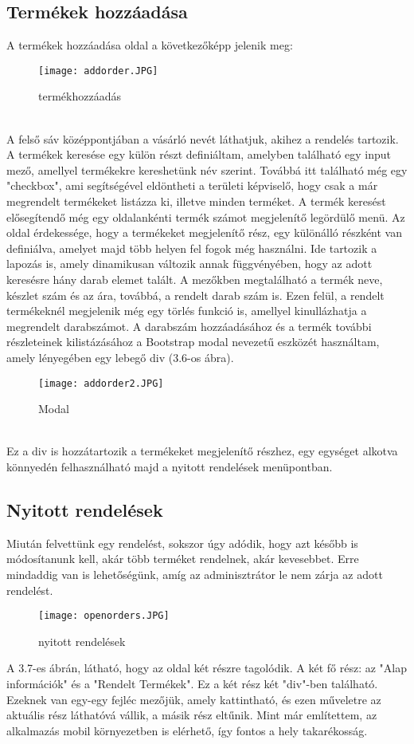 \subsection{Termékek hozzáadása}
A termékek hozzáadása oldal a következőképp jelenik meg:
\begin{figure}[h]
    \centering
    \texttt{[image: addorder.JPG]}
    \caption{termékhozzáadás}
\end{figure}
\\
A felső sáv középpontjában a vásárló nevét láthatjuk, akihez a rendelés tartozik. A termékek keresése egy külön részt definiáltam, amelyben található egy input mező, amellyel termékekre kereshetünk név szerint. Továbbá itt található még egy "checkbox", ami segítségével eldöntheti a területi képviselő, hogy csak a már megrendelt termékeket listázza ki, illetve minden terméket. A termék keresést elősegítendő még egy oldalankénti termék számot megjelenítő legördülő menü. 
Az oldal érdekessége, hogy a termékeket megjelenítő rész, egy különálló részként van definiálva, amelyet majd több helyen fel fogok még használni. Ide tartozik a lapozás is, amely dinamikusan változik annak függvényében, hogy az adott keresésre hány darab elemet talált. A mezőkben megtalálható a termék neve, készlet szám és az ára, továbbá, a rendelt darab szám is. Ezen felül, a rendelt termékeknél megjelenik még egy törlés funkció is, amellyel kinullázhatja a megrendelt darabszámot. A darabszám hozzáadásához és a termék további részleteinek kilistázásához a Bootstrap modal nevezetű eszközét használtam, amely lényegében egy lebegő div (3.6-os ábra).
\begin{figure}[h]
    \centering
    \texttt{[image: addorder2.JPG]}
    \caption{Modal}
\end{figure}\\
Ez a div is hozzátartozik a termékeket megjelenítő részhez, egy egységet alkotva könnyedén felhasználható majd a nyitott rendelések menüpontban.
\subsection{Nyitott rendelések}
Miután felvettünk egy rendelést, sokszor úgy adódik, hogy azt később is módosítanunk kell, akár több terméket rendelnek, akár kevesebbet. Erre mindaddig van is lehetőségünk, amíg az adminisztrátor le nem zárja az adott rendelést. 
\begin{figure}[h]
    \centering
    \texttt{[image: openorders.JPG]}
    \caption{nyitott rendelések}
\end{figure}\newpage
A 3.7-es ábrán, látható, hogy az oldal két részre tagolódik. A két fő rész: az "Alap információk" és  a "Rendelt Termékek". Ez a két rész két "div"-ben található. Ezeknek van egy-egy fejléc mezőjük, amely kattintható, és ezen műveletre az aktuális rész láthatóvá vállik, a másik rész eltűnik. Mint már említettem, az alkalmazás mobil környezetben is elérhető, így fontos a hely takarékosság.

